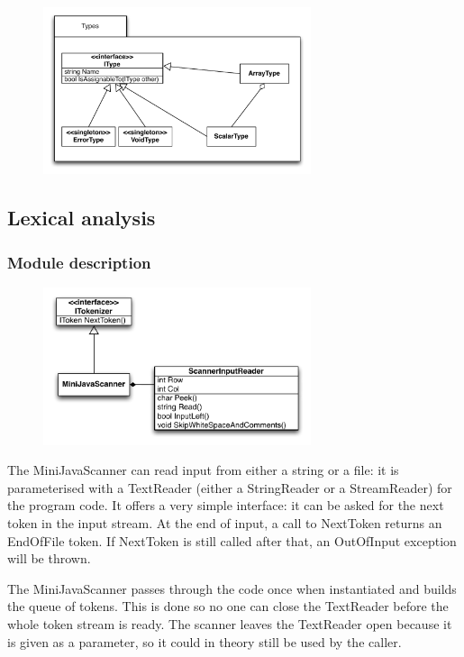 \documentclass[a4paper,11pt]{article}
\begin{document}
\begin{figure}[h!]
\centering
\includegraphics[width=0.7\textwidth]{types.pdf}
\end{figure}

\subsection{Lexical analysis}

\subsubsection{Module description}

\begin{figure}[h!]
\centering
\includegraphics[width=0.7\textwidth]{lexical_analysis.pdf}
\end{figure}

The MiniJavaScanner can read input from either a string or a file: it is parameterised with a TextReader (either a StringReader or a StreamReader) for the program code. It offers a very simple interface: it can be asked for the next token in the input stream. At the end of input, a call to NextToken returns an EndOfFile token. If NextToken is still called after that, an OutOfInput exception will be thrown.

The MiniJavaScanner passes through the code once when instantiated and builds the queue of tokens. This is done so no one can close the TextReader before the whole token stream is ready. The scanner leaves the TextReader open because it is given as a parameter, so it could in theory still be used by the caller.
\end{document}
